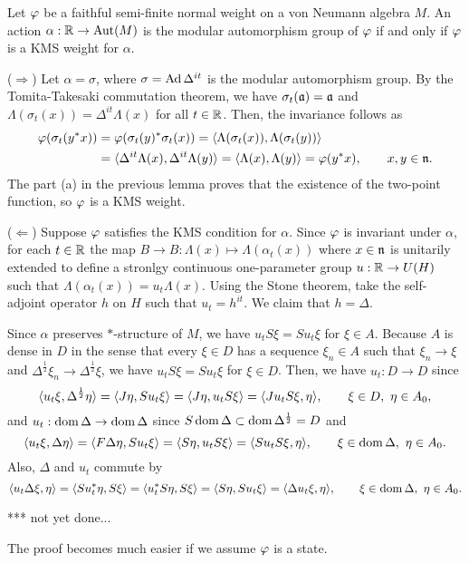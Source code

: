 \documentclass{../../../small}
\begin{document}
\begin{prop}
Let $\varphi$ be a faithful semi-finite normal weight on a von Neumann algebra $M$.
An action $\alpha:\mathbb{R}\to\operatorname{Aut}(M)$ is the modular automorphism group of $\varphi$ if and only if $\varphi$ is a KMS weight for $\alpha$.
\end{prop}
\begin{pf}
($\Rightarrow$)
Let $\alpha=\sigma$, where $\sigma=\operatorname{Ad}\Delta^{it}$ is the modular automorphism group.
By the Tomita-Takesaki commutation theorem, we have $\sigma_t(\mathfrak{a})=\mathfrak{a}$ and $\Lambda(\sigma_t(x))=\Delta^{it}\Lambda(x)$ for all $t\in\mathbb{R}$.
Then, the invariance follows as
\begin{align*}
\varphi(\sigma_t(y^*x))&=\varphi(\sigma_t(y)^*\sigma_t(x))=\langle\Lambda(\sigma_t(x)),\Lambda(\sigma_t(y))\rangle\\
&=\langle\Delta^{it}\Lambda(x),\Delta^{it}\Lambda(y)\rangle=\langle\Lambda(x),\Lambda(y)\rangle=\varphi(y^*x),\qquad x,y\in\mathfrak{n}.
\end{align*}
The part (a) in the previous lemma proves that the existence of the two-point function, so $\varphi$ is a KMS weight.

($\Leftarrow$)
Suppose $\varphi$ satisfies the KMS condition for $\alpha$.
Since $\varphi$ is invariant under $\alpha$, for each $t\in\mathbb{R}$ the map $B\to B:\Lambda(x)\mapsto\Lambda(\alpha_t(x))$ where $x\in\mathfrak{n}$ is unitarily extended to define a stronlgy continuous one-parameter group $u:\mathbb{R}\to U(H)$ such that $\Lambda(\alpha_t(x))=u_t\Lambda(x)$.
Using the Stone theorem, take the self-adjoint operator $h$ on $H$ such that $u_t=h^{it}$.
We claim that $h=\Delta$.

Since $\alpha$ preserves $*$-structure of $M$, we have $u_tS\xi=Su_t\xi$ for $\xi\in A$.
Because $A$ is dense in $D$ in the sense that every $\xi\in D$ has a sequence $\xi_n\in A$ such that $\xi_n\to\xi$ and $\Delta^{\frac12}\xi_n\to\Delta^{\frac12}\xi$, we have $u_tS\xi=Su_t\xi$ for $\xi\in D$.
Then, we have $u_t:D\to D$ since
\[\langle u_t\xi,\Delta^{\frac12}\eta\rangle=\langle J\eta,Su_t\xi\rangle=\langle J\eta,u_tS\xi\rangle=\langle Ju_tS\xi,\eta\rangle,\qquad\xi\in D,\ \eta\in A_0,\]
and $u_t:\operatorname{dom}\Delta\to\operatorname{dom}\Delta$ since $S\operatorname{dom}\Delta\subset\operatorname{dom}\Delta^{\frac12}=D$ and
\[\<u_t\xi,\Delta\eta\>=\<F\Delta\eta,Su_t\xi\>=\<S\eta,u_tS\xi\>=\<Su_tS\xi,\eta\>,\qquad\xi\in\dom\Delta,\ \eta\in A_0.\]
Also, $\Delta$ and $u_t$ commute by
\[\langle u_t\Delta\xi,\eta\rangle=\langle Su_t^*\eta,S\xi\rangle=\langle u_t^*S\eta,S\xi\rangle=\langle S\eta,Su_t\xi\rangle=\langle\Delta u_t\xi,\eta\rangle,\qquad\xi\in\operatorname{dom}\Delta,\ \eta\in A_0.\]

*** not yet done...



The proof becomes much easier if we assume $\varphi$ is a state.
\end{pf}
\end{document}
